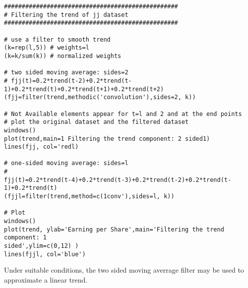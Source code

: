 \begin{example}
    \begin{verbatim}
#################################################
# Filtering the trend of jj dataset
#################################################

# use a filter to smooth trend 
(k=rep(l,5)) # weights=l 
(k=k/sum(k)) # normalized weights

# two sided moving average: sides=2
# fjj(t)=0.2*trend(t-2)+0.2*trend(t-1)+0.2*trend(t)+0.2*trend(t+1)+0.2*trend(t+2)
(fjj=filter(trend,methodic('convolution'),sides=2, k))

# Not Available elements appear for t=l and 2 and at the end points
# plot the original dataset and the filtered dataset 
windows()
plot(trend,main=1 Filtering the trend component: 2 sided1) 
lines(fjj, col='redl)

# one-sided moving average: sides=l
#
fjj(t)=0.2*trend(t-4)+0.2*trend(t-3)+0.2*trend(t-2)+0.2*trend(t-1)+0.2*trend(t) 
(fjjl=filter(trend,method=c(1conv'),sides=l, k))

# Plot 
windows()
plot(trend, ylab='Earning per Share',main='Filtering the trend component: 1 
sided',ylim=c(0,12) ) 
lines(fjjl, col='blue')
    \end{verbatim}
\end{example}

Under suitable conditions, the two sided moving averrage filter may be used to approximate a linear trend.

